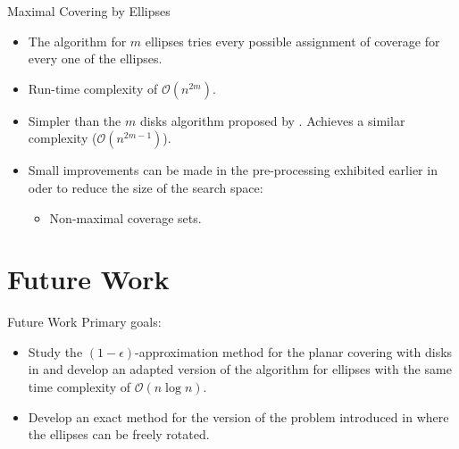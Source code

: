 \documentclass{beamer}
\newcommand{\bigO}{\mathscr{O}}
\begin{document}
\begin{frame}{Maximal Covering by Ellipses}
	
	\begin{itemize}
		\item The algorithm for $m$ ellipses tries every possible assignment of coverage for every one of the ellipses.
		\item Run-time complexity of $\bigO(n^{2m})$.
		
		\item Simpler than the $m$ disks algorithm proposed by \autocite{cabello:2006}. Achieves a similar complexity ($\bigO(n^{2m-1})$).
		
		\item Small improvements can be made in the pre-processing exhibited earlier in oder to reduce the size of the search space:
		\begin{itemize}
			\item Non-maximal coverage sets.
		\end{itemize}
	
	\end{itemize}
	
\end{frame}




\section{Future Work}

\begin{frame}{Future Work}
	Primary goals:
\begin{itemize}
	\item Study the $(1-\epsilon)$-approximation method for the planar covering with disks in \autocite{cabello:2006} and develop an adapted version of the algorithm for ellipses with the same time complexity of $\bigO(n\log{n})$.
	
	\item Develop an exact method for the version of the problem introduced in \autocite{andreta} where the ellipses can be freely rotated.
\end{itemize}
\end{frame}
\end{document}
